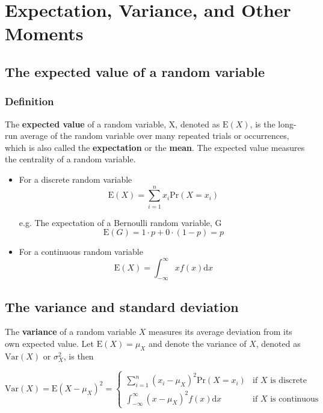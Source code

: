 \documentclass[a4paper,11pt]{article}
\begin{document}
\section{Expectation, Variance, and Other Moments}
\label{sec:orgde02742}

\subsection{The expected value of a random variable}
\label{sec:org54a52e6}

\subsubsection*{Definition}
\label{sec:org83f6ba3}

The \textbf{expected value} of a random variable, X, denoted as \(\mathrm{E}(X)\), is
the long-run average of the random variable over many repeated
trials or occurrences, which is also called the \textbf{expectation} or the
\textbf{mean}. The expected value measures the centrality of a random
variable.

\begin{itemize}
\item For a discrete random variable
\[ \mathrm{E}(X) = \sum_{i=1}^n x_i \mathrm{Pr}(X = x_i) \]

e.g. The expectation of a Bernoulli random variable, G
  \[ \mathrm{E}(G) = 1 \cdot p + 0 \cdot (1-p) = p \]

\item For a continuous random variable
\[ \mathrm{E}(X) = \int_{-\infty}^{\infty} x f(x) \mathrm{d}x\]
\end{itemize}

\subsection{The variance and standard deviation}
\label{sec:org57332c4}

The \textbf{variance} of a random variable \(X\) measures its average
deviation from its own expected value. Let \(\mathrm{E}(X) = \mu_X\) and denote
the variance of \(X\), denoted as \(\mathrm{Var}(X)\) or \(\sigma^2_X\), is then

\begin{equation*}
\mathrm{Var}(X) = \mathrm{E}(X-\mu_X)^{2}=
\begin{cases}
\sum_{i=1}^n (x_i - \mu_X)^{2}\mathrm{Pr}(X = x_i) & \text{if } X \text{ is discrete} \\
\int_{-\infty}^{\infty} (x - \mu_X)^{2}f(x)\mathrm{d} x  & \text{if } X \text{ is continuous}
\end{cases}
\end{equation*}
\end{document}
